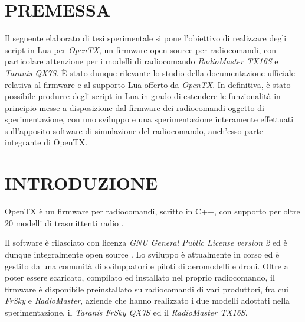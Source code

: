 \documentclass[a4paper, 12pt]{report} %
\begin{document}


\tableofcontents %
\fontsize{12pt}{14pt}\selectfont %

\titleformat{\chapter}[display]
{\Huge\bfseries}{}{0pt}{\thechapter\ \ \ \ }
\newpage
\clearpage
\chapter{PREMESSA}
Il seguente elaborato di tesi sperimentale si pone l'obiettivo di realizzare degli script in Lua per \emph{OpenTX}, un firmware open source per radiocomandi, con particolare attenzione per i modelli di radiocomando \emph{RadioMaster TX16S} e \emph{Taranis QX7S}. È stato dunque rilevante lo studio della documentazione ufficiale relativa al firmware e al supporto Lua offerto da \emph{OpenTX}. In definitiva, è stato possibile produrre degli script in Lua in grado di estendere le funzionalità in principio messe a disposizione dal firmware dei radiocomandi oggetto di sperimentazione, con uno sviluppo e una sperimentazione interamente effettuati sull'apposito software di simulazione del radiocomando, anch'esso parte integrante di OpenTX.

\clearpage


\chapter{INTRODUZIONE}

OpenTX \cite{opentx-website} è un firmware per radiocomandi, scritto in C++, con supporto per oltre $20$ modelli di trasmittenti radio \cite{opentx-radios}.

Il software è rilasciato con licenza \emph{GNU General Public License version 2} ed è dunque integralmente open source \cite{opentx-github}. Lo sviluppo è attualmente in corso ed è gestito da una comunità di sviluppatori e piloti di aeromodelli e droni. Oltre a poter essere scaricato, compilato ed installato nel proprio radiocomando, il firmware è disponibile preinstallato su radiocomandi di vari produttori, fra cui \emph{FrSky} e \emph{RadioMaster}, aziende che hanno realizzato i due modelli adottati nella sperimentazione, il \emph{Taranis FrSky QX7S} ed il \emph{RadioMaster TX16S}.
\end{document}
